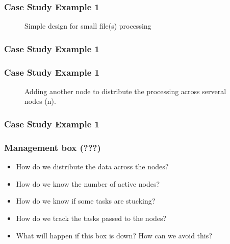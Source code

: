 \begin{frame}[plain,c]
	\frametitle{Case Study Example 1}
		\begin{figure}
		
		\caption{Simple design for small file(s) processing } \label{fig:DS1}
		\end{figure}
\end{frame}
\begin{frame}[plain,c]
	\frametitle{Case Study Example 1}
	\begin{figure}
		\centering
		
		 \label{fig:DS2}
	\end{figure}

\end{frame}
\begin{frame}[plain,c]
	\frametitle{Case Study Example 1}
		\begin{figure}
		\centering
			
			\caption{Adding another node to distribute the processing across serveral nodes (n). } \label{fig:DS3}
		\end{figure}

\end{frame}
\begin{frame}[plain,c]
	\frametitle{Case Study Example 1}
	\begin{figure}
		\centering
		
	\end{figure}
	
\end{frame}

\begin{frame}
	\frametitle{Management box (???)}
	\begin{itemize} [<+->]
		\item How do we distribute the data across the nodes?
		\item How do we know the number of active nodes?
		\item How do we know if some tasks are stucking?
		\item How do we track the tasks passed to the nodes?
		\item What will happen if this box is down? How can we avoid this?
	\end{itemize}
\end{frame}

